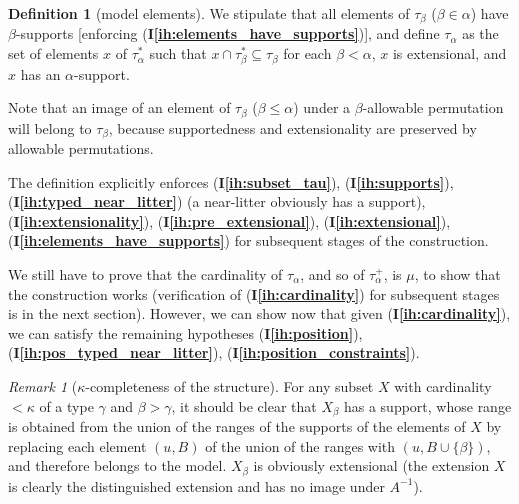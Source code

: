 \documentclass[112pt]{article}
\theoremstyle{definition}
\newtheorem{definition}[theorem]{Definition}
\theoremstyle{remark}
\newtheorem{remark}[theorem]{Remark}
\newcommand{\ihref}[1]{(\textbf{I\ref{#1}})}
\newcommand{\rk}[1]{{\color{blue}\sl #1}}
\begin{document}
\begin{definition}[model elements]
We stipulate that all elements of $\tau_\beta$ ($\beta\in \alpha$) have $\beta$-supports [enforcing \ihref{ih:elements_have_supports}], and define $\tau_\alpha$ as the set of elements $x$ of $\tau^*_\alpha$ such that
$x \cap \tau^*_{\beta} \subseteq \tau_\beta$ for each $\beta<\alpha$, $x$ is extensional, and $x$ has an $\alpha$-support.
\end{definition}

Note that an image of an element of $\tau_\beta$ ($\beta\leq \alpha$)  under a $\beta$-allowable permutation will belong to $\tau_\beta$, because supportedness and extensionality are preserved by allowable permutations.

The definition explicitly enforces \ihref{ih:subset_tau}, \ihref{ih:supports}, \ihref{ih:typed_near_litter} (a near-litter obviously has a support), \ihref{ih:extensionality}, \ihref{ih:pre_extensional}, \ihref{ih:extensional}, \ihref{ih:elements_have_supports} for subsequent stages of the construction.

We still have to prove that the cardinality of $\tau_\alpha$, and so of $\tau^+_\alpha$, is $\mu$, to show that the construction works (verification of \ihref{ih:cardinality} for subsequent stages is in the next section).
{However, we can show now that given \ihref{ih:cardinality}, we can satisfy the remaining hypotheses \ihref{ih:position}, \ihref{ih:pos_typed_near_litter}, \ihref{ih:position_constraints}.}

\begin{remark}[$\kappa$-completeness of the structure]
For any subset $X$ with cardinality $<\kappa$ of a type $\gamma$ and $\beta>\gamma$, it should be clear that $X_\beta$ has a support, whose range is obtained from the union of the ranges of the supports of the elements of $X$  by replacing each element $(u,B)$ of the union of the ranges  with $(u,B \cup \{\beta\})$, and therefore belongs to the model.  $X_\beta$ is obviously extensional (the extension $X$ is clearly the distinguished extension and has no image under $A^{-1}$).
\end{remark}
\end{document}
